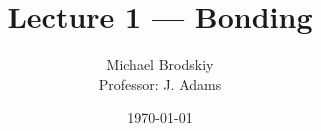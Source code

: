 


\title{Lecture 1 — Bonding}
\date{\today}
\author{Michael Brodskiy\\ \small Professor: J. Adams}



\maketitle


